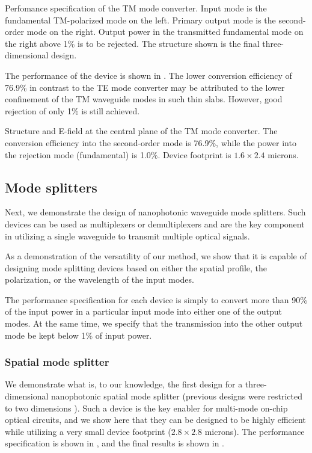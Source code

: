\documentclass[letterpaper,10pt]{article}
\begin{document}
    {Perfomance specification of the TM mode converter.
    Input mode is the fundamental TM-polarized mode on the left.
    Primary output mode is the second-order mode on the right.
    Output power in the transmitted fundamental mode on the right 
    above 1\% is to be rejected.
    The structure shown is the final three-dimensional design.}
    
The performance of the device is shown in .
The lower conversion efficiency of 76.9\% in contrast to the TE mode converter
    may be attributed to the lower confinement of the TM waveguide modes 
    in such thin slabs.
However, good rejection of only 1\% is still achieved.

    {Structure and E-field at the central plane of the TM mode converter.
    The conversion efficiency into the second-order mode is 76.9\%,
    while the power into the rejection mode (fundamental) is 1.0\%.
    Device footprint is $1.6\times2.4$ microns.}

\subsection{Mode splitters}
Next, we demonstrate the design of nanophotonic waveguide mode splitters.
Such devices can be used as multiplexers or demultiplexers and
    are the key component in utilizing a single waveguide to transmit 
    multiple optical signals.

As a demonstration of the versatility of our method, 
    we show that it is capable of designing mode splitting devices 
    based on either the spatial profile, the polarization, or the wavelength
    of the input modes.

The performance specification for each device is simply to convert
    more than 90\% of the input power in a particular input mode into
    either one of the output modes.
At the same time, we specify that the transmission into the other output mode 
    be kept below 1\% of input power.

\subsubsection{Spatial mode splitter}
We demonstrate what is, to our knowledge, 
    the first design for a three-dimensional
    nanophotonic spatial mode splitter 
    (previous designs were restricted to two dimensions \cite{2dsplitter}).
Such a device is the key enabler for multi-mode on-chip optical circuits,
    and we show here that they can be designed to be highly efficient
    while utilizing a very small device footprint ($2.8\times2.8$ microns). 
The performance specification is shown in ,
    and the final results is shown in .
\end{document}
